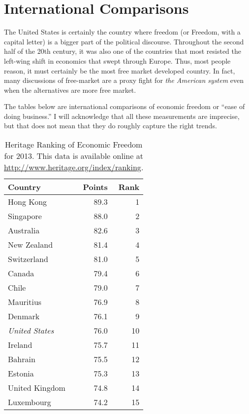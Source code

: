 \chapter{International Comparisons}\label{chpt:international}

The United States is certainly the country where freedom (or Freedom, with a
capital letter) is a bigger part of the political discourse. Throughout the
second half of the 20th century, it was also one of the countries that most
resisted the left-wing shift in economics that swept through Europe. Thus, most
people reason, it must certainly be the most free market developed country. In
fact, many discussions of free-market are a proxy fight for \emph{the American
system} even when the alternatives are more free market.

The tables below are international comparisons of economic freedom or ``ease of
doing business.'' I will acknowledge that all these measurements are imprecise,
but that does not mean that they do roughly capture the right trends.

\begin{table}
\centering
\begin{tabular}{lrr}
\toprule
Country & Points & Rank \\
\midrule
Hong Kong             & 89.3 &  1 \\
Singapore             & 88.0 &  2 \\
Australia             & 82.6 &  3 \\
New Zealand           & 81.4 &  4 \\
Switzerland           & 81.0 &  5 \\
Canada                & 79.4 &  6 \\
Chile                 & 79.0 &  7 \\
Mauritius             & 76.9 &  8 \\
Denmark               & 76.1 &  9 \\
\emph{United States}  & 76.0 & 10 \\
Ireland               & 75.7 & 11 \\
Bahrain               & 75.5 & 12 \\
Estonia               & 75.3 & 13 \\
United Kingdom        & 74.8 & 14 \\
Luxembourg            & 74.2 & 15 \\
\bottomrule
\end{tabular}
\caption{Heritage Ranking of Economic Freedom for 2013. This data is available
online at \url{http://www.heritage.org/index/ranking}.}
\label{tab:heritage}
\end{table}

